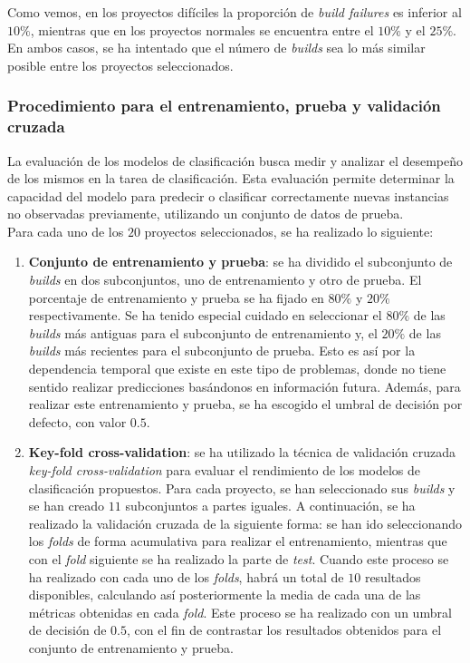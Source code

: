 Como vemos, en los proyectos difíciles la proporción de \textit{build failures} es inferior al
$10\%$, mientras que en los proyectos normales se encuentra entre el $10\%$ y el $25\%$. En
ambos casos, se ha intentado que el número de \textit{builds} sea lo más similar posible entre
los proyectos seleccionados.\\

\subsubsection{Procedimiento para el entrenamiento, prueba  y validación cruzada}
La evaluación de los modelos de clasificación busca medir y analizar el desempeño de los mismos
en la tarea de clasificación. Esta evaluación permite determinar la capacidad del modelo para
predecir o clasificar correctamente nuevas instancias no observadas previamente, utilizando un
conjunto de datos de prueba.\\

\noindent Para cada uno de los $20$ proyectos seleccionados, se ha realizado lo siguiente:


\begin{enumerate}
    \item \textbf{Conjunto de entrenamiento y prueba}: se ha dividido el subconjunto de
    \textit{builds} en dos subconjuntos, uno de entrenamiento y otro de prueba. El porcentaje
    de entrenamiento y prueba se ha fijado en $80\%$ y $20\%$ respectivamente. Se ha tenido
    especial cuidado en seleccionar el $80\%$ de las \textit{builds} más antiguas para el
    subconjunto de entrenamiento y, el $20\%$ de las \textit{builds} más recientes para el
    subconjunto de prueba. Esto es así por la dependencia temporal que existe en este tipo de
    problemas, donde no tiene sentido realizar predicciones basándonos en información futura.
    Además, para realizar este entrenamiento y prueba, se ha escogido el umbral de decisión
    por defecto, con valor $0.5$.\\

    \item \textbf{Key-fold cross-validation}: se ha utilizado la técnica de validación cruzada
    \textit{key-fold cross-validation} para evaluar el rendimiento de los modelos de clasificación
    propuestos. Para cada proyecto, se han seleccionado sus \textit{builds} y se han creado $11$
    subconjuntos a partes iguales. A continuación, se ha realizado la validación cruzada de
    la siguiente forma: se han ido seleccionando los \textit{folds} de forma acumulativa para
    realizar el entrenamiento, mientras que con el \textit{fold} siguiente se ha realizado la
    parte de \textit{test}. Cuando este proceso se ha realizado con cada uno de los \textit{folds},
    habrá un total de $10$ resultados disponibles, calculando así posteriormente la media de cada
    una de las métricas obtenidas en cada \textit{fold}. Este proceso se ha realizado
    con un umbral de decisión de $0.5$, con el fin de contrastar los resultados obtenidos para el 
    conjunto de entrenamiento y prueba.\\
\end{enumerate}

